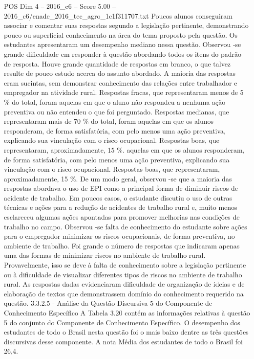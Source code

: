 \begin{textsample}{POS Dim 4 – 2016\_c6 – Score 5.00 – 2016\_c6/enade\_2016\_tec\_agro\_1c1f311707.txt}
Poucos alunos conseguiram associar e comentar suas respostas segundo a legislação pertinente, demonstrando pouco ou superficial conhecimento na área do tema proposto pela questão.
Os estudantes apresentaram um desempenho mediano nessa questão.
Observou -se grande dificuldade em responder à questão abordando todos os itens do padrão de resposta.
Houve grande quantidade de respostas em branco, o que talvez resulte de pouco estudo acerca do assunto abordado.
A maioria das respostas eram sucintas, sem demonstrar conhecimento das relações entre trabalhador e empregador na atividade rural.
Respostas fracas, que representaram menos de 5 \% do total, foram aquelas em que o aluno não respondeu a nenhuma ação preventiva ou não entendeu o que foi perguntado.
Respostas medianas, que representaram mais de 70 \% do total, foram aquelas em que os alunos responderam, de forma satisfatória, com pelo menos uma ação preventiva, explicando sua vinculação com o risco ocupacional.
Respostas boas, que representaram, aproximadamente, 15 \%. aquelas em que os alunos responderam, de forma satisfatória, com pelo menos uma ação preventiva, explicando sua vinculação com o risco ocupacional.
Respostas boas, que representaram, aproximadamente, 15 \%.
De um modo geral, observou -se que a maioria das respostas abordava o uso de EPI como a principal forma de diminuir riscos de acidente de trabalho.
Em poucos casos, o estudante discutiu o uso de outras técnicas e ações para a redução de acidentes de trabalho rural e, muito menos esclareceu algumas ações apontadas para promover melhorias nas condições de trabalho no campo.
Observou -se falta de conhecimento do estudante sobre ações para o empregador minimizar os riscos ocupacionais, de forma preventiva, no ambiente de trabalho.
Foi grande o número de respostas que indicaram apenas uma das formas de minimizar riscos no ambiente de trabalho rural.
Provavelmente, isso se deve à falta de conhecimento sobre a legislação pertinente ou à dificuldade de visualizar diferentes tipos de riscos no ambiente de trabalho rural.
As respostas dadas evidenciaram dificuldade de organização de ideias e de elaboração de textos que demonstrassem domínio do conhecimento requerido na questão. 3.3.2.5 - Análise da Questão Discursiva 5 do Componente de Conhecimento Específico A Tabela 3.20 contém as informações relativas à questão 5 do conjunto do Componente de Conhecimento Específico.
O desempenho dos estudantes de todo o Brasil nesta questão foi o mais baixo dentre as três questões discursivas desse componente.
A nota Média dos estudantes de todo o Brasil foi 26,4.

\end{textsample}

